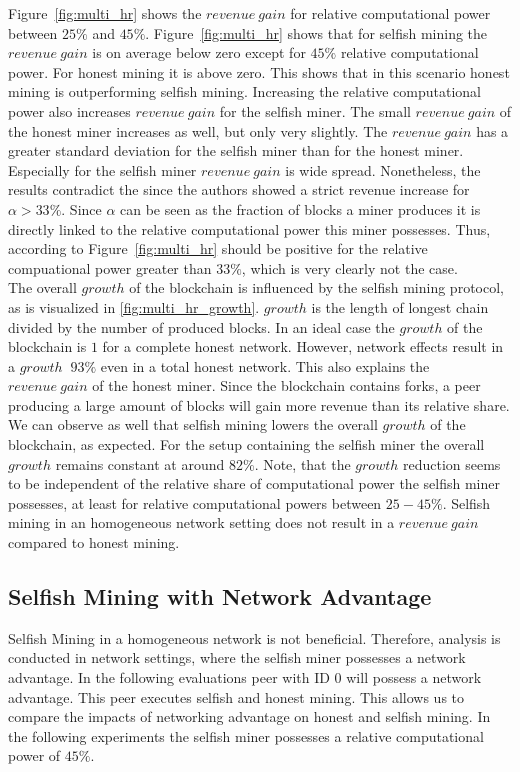 Figure~\ref{fig:multi_hr} shows the $revenue~gain$ for relative computational power between $25\% $ and $45\% $. Figure~\ref{fig:multi_hr} shows that for selfish mining the $revenue~gain$ is on average below zero except for $45\% $ relative computational power. For honest mining it is above zero. This shows that in this scenario honest mining is outperforming selfish mining. Increasing the relative computational power also increases $revenue~gain$ for the selfish miner. The small $revenue~gain$ of the honest miner increases as well, but only very slightly. The $revenue~gain$ has a greater standard deviation for the selfish miner than for the honest miner. Especially for the selfish miner $revenue~gain$ is wide spread. Nonetheless, the results contradict the  since the authors showed a strict revenue increase for $\alpha > 33\% $. Since $\alpha$ can be seen as the fraction of blocks a miner produces it is directly linked to the relative computational power this miner possesses. Thus, according to  Figure~\ref{fig:multi_hr} should be positive for the relative compuational power greater than $33\% $, which is very clearly not the case.\\
The overall $growth$ of the blockchain is influenced by the selfish mining protocol, as is visualized in \ref{fig:multi_hr_growth}. $growth$ is the length of longest chain divided by the number of produced blocks. In an ideal case the $growth$ of the blockchain is $1$ for a complete honest network. However, network effects result in a $growth$ $~93\% $ even in a total honest network. This also explains the $revenue~gain$ of the honest miner. Since the blockchain contains forks, a peer producing a large amount of blocks will gain more revenue than its relative share. We can observe as well that selfish mining lowers the overall $growth$ of the blockchain, as expected. For the setup containing the selfish miner the overall $growth$ remains constant at around $82\% $. Note, that the $growth$ reduction seems to be independent of the relative share of computational power the selfish miner possesses, at least for relative computational powers between $25-45\% $.
Selfish mining in an homogeneous network setting does not result in a $revenue~gain$ compared to honest mining.

\subsection{Selfish Mining with Network Advantage}
Selfish Mining in a homogeneous network is not beneficial. Therefore, analysis is conducted in network settings, where the selfish miner possesses a network advantage. In the following evaluations peer with ID $0$ will possess a network advantage. This peer executes selfish and honest mining. This allows us to compare the impacts of networking advantage on honest and selfish mining. In the following experiments the selfish miner possesses a relative computational power of $45\% $.

